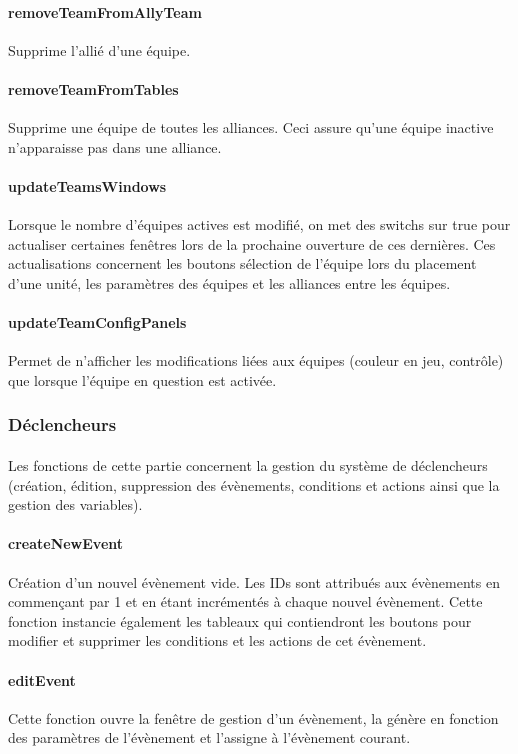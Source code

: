 \documentclass[a4paper]{article}
\begin{document}
\paragraph{removeTeamFromAllyTeam} Supprime l'allié d'une équipe.
\paragraph{removeTeamFromTables} Supprime une équipe de toutes les alliances. Ceci assure qu'une équipe inactive n'apparaisse pas dans une alliance.
\paragraph{updateTeamsWindows} Lorsque le nombre d'équipes actives est modifié, on met des switchs sur true pour actualiser certaines fenêtres lors de la prochaine ouverture de ces dernières. Ces actualisations concernent les boutons sélection de l'équipe lors du placement d'une unité, les paramètres des équipes et les alliances entre les équipes.
\paragraph{updateTeamConfigPanels} Permet de n'afficher les modifications liées aux équipes (couleur en jeu, contrôle) que lorsque l'équipe en question est activée.
\subsubsection{Déclencheurs}
\paragraph{}
Les fonctions de cette partie concernent la gestion du système de déclencheurs (création, édition, suppression des évènements, conditions et actions ainsi que la gestion des variables).
\paragraph{createNewEvent} Création d'un nouvel évènement vide. Les IDs sont attribués aux évènements en commençant par 1 et en étant incrémentés à chaque nouvel évènement. Cette fonction instancie également les tableaux qui contiendront les boutons pour modifier et supprimer les conditions et les actions de cet évènement.
\paragraph{editEvent} Cette fonction ouvre la fenêtre de gestion d'un évènement, la génère en fonction des paramètres de l'évènement et l'assigne à l'évènement courant.
\end{document}
